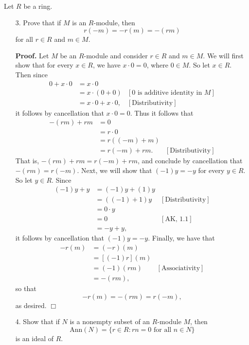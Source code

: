 \documentclass[9pt]{article}
\newcommand{\qed}{\hfill \ensuremath{\Box}}
\begin{document}
Let $R$ be a ring.
\begin{enumerate}
   \item[3.]   Prove that if $M$ is an $R$-module, then
               $$r(-m) = -r(m) = -(rm)$$
               for all $r \in R$ and $m \in M$.

      \textbf{Proof.} Let $M$ be an $R$-module and consider $r \in R$ and
      $m \in M$. We will first show that for every $x \in R$, we have
      $x \cdot 0 = 0$, where $0 \in M$. So let $x \in R$. Then since
      \begin{align*}
         0 + x \cdot 0 &= x \cdot 0 \\
                   &= x \cdot (0 + 0) &[0 \text{ is additive identity in }M] \\
                   &= x \cdot 0 + x \cdot 0, &[\text{Distributivity}]
      \end{align*}
      it follows by cancellation that $x \cdot 0 = 0$. Thus it follows that
      \begin{align*}
         -(rm) + rm &= 0 \\
           &= r \cdot 0 \\
           &=  r((-m) + m) \\
           &= r(-m) + rm. &[\text{Distributivity}]
      \end{align*}
      That is, $-(rm) + rm = r(-m) + rm$, and conclude by cancellation that
      $-(rm) = r(-m)$. Next, we will show that $(-1)y = -y$ for every $y \in R$.
      So let $y \in R$. Since
      \begin{align*}
         (-1)y + y &= (-1)y + (1)y \\
            &= ((-1) + 1)y &[\text{Distributivity}] \\
            &= 0 \cdot y \\
            &= 0 & [\text{AK, }1.1]\\
            &= -y + y,
      \end{align*}
      it follows by cancellation that $(-1)y = -y$. Finally, we have that
      \begin{align*}
         -r(m) &= (-r)(m) \\
               &= [(-1)r](m) \\
               &= (-1)(rm) &[\text{Associativity}] \\
               &= -(rm),
      \end{align*}
      so that
      $$-r(m) = -(rm) = r(-m),$$
      as desired. \qed
   \item[4.]   Show that if $N$ is a nonempty subset of an $R$-module $M$, then
               $$\text{Ann}({N}) = \{r \in R : rn = 0
                 \text{ for all }n \in N\}$$
               is an ideal of $R$.


\end{enumerate}
\end{document}
